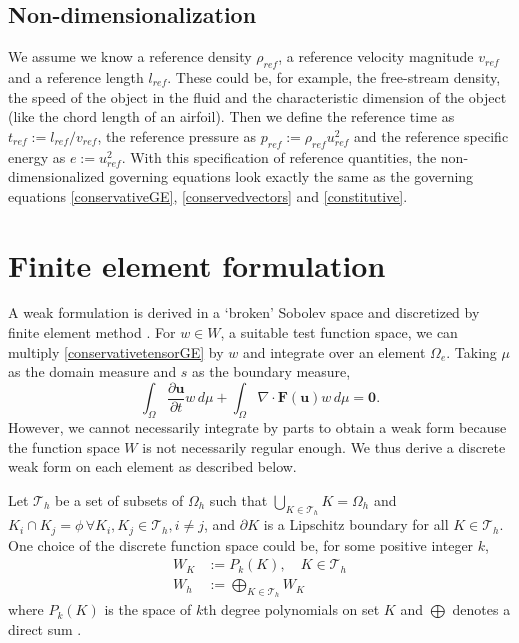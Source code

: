 \documentclass[11pt]{article}
\let\bld\boldsymbol
\begin{document}
\subsection{Non-dimensionalization}
We assume we know a reference density $\rho_{ref}$, a reference velocity magnitude $v_{ref}$ and a reference length $l_{ref}$. These could be, for example, the free-stream density, the speed of the object in the fluid and the characteristic dimension of the object (like the chord length of an airfoil). Then we define the reference time as $t_{ref} := l_{ref}/v_{ref}$, the reference pressure as $p_{ref} := \rho_{ref}u_{ref}^2$ and the reference specific energy as $e := u_{ref}^2$. With this specification of reference quantities, the non-dimensionalized governing equations look exactly the same as the governing equations \eqref{conservativeGE}, \eqref{conservedvectors} and \eqref{constitutive}.

\section{Finite element formulation}

A weak formulation is derived in a `broken' Sobolev space and discretized by finite element method \cite{luo_taylor}. For $w \in W$, a suitable test function space, we can multiply \eqref{conservativetensorGE} by $w$ and integrate over an element $\Omega_e$. Taking $\mu$ as the domain measure and $s$ as the boundary measure,
\begin{equation}
\int_{\Omega} \frac{\partial\bld{u}}{\partial t}w\,d\mu + \int_{\Omega}\nabla\cdot\bld{F(\bld{u})}w \,d\mu = \bld{0}.
\end{equation}
However, we cannot necessarily integrate by parts to obtain a weak form because the function space $W$ is not necessarily regular enough. We thus derive a discrete weak form on each element as described below.

Let $\mathcal{T}_h$ be a set of subsets of $\Omega_h$ such that $\bigcup_{K\in \mathcal{T}_h}K = \Omega_h$ and $K_i \cap K_j = \phi \, \forall K_i, K_j \in \mathcal{T}_h, i \neq j$, and $\partial K$ is a Lipschitz boundary for all $K \in \mathcal{T}_h$. One choice of the discrete function space could be, for some positive integer $k$,
\begin{align}
W_{K} &:= P_k(K), \quad K \in \mathcal{T}_h \\
W_h &:= \bigoplus_{K \in \mathcal{T}_h} W_{K}
\end{align}
where $P_k(K)$ is the space of $k$th degree polynomials on set $K$ and $\bigoplus$ denotes a direct sum \cite{nodaldg}.
\end{document}
